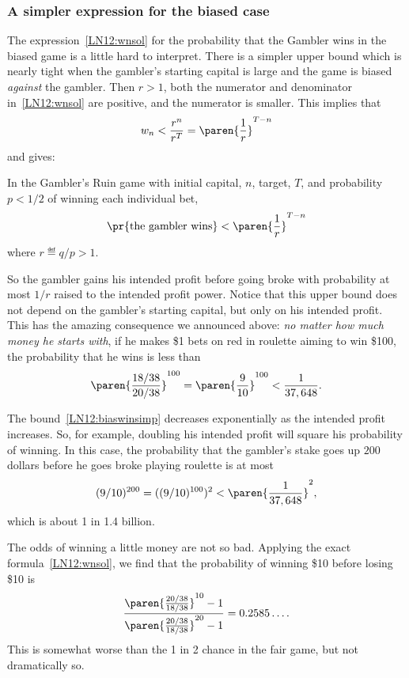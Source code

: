 \subsubsection{A simpler expression for the biased case}
The expression~\eqref{LN12:wnsol} for the probability that the Gambler
wins in the biased game is a little hard to interpret.  There is a
simpler upper bound which is nearly tight when the gambler's starting
capital is large and the game is biased \emph{against} the gambler.
Then $r >1$, both the numerator and denominator
in~\eqref{LN12:wnsol} are positive, and the numerator is smaller.
This implies that
\[
w_n < \frac{r^n}{r^T} = \paren{\frac{1}{r}}^{T-n}
\]
and gives:
\begin{corollary}\label{LN12:biaswincor}
  In the Gambler's Ruin game with initial capital, $n$, target, $T$,
  and probability $p < 1/2$ of winning each individual bet,
\begin{equation}\label{LN12:biaswinsimp}
\pr{\text{the gambler wins}} <  \paren{\frac{1}{r}}^{T-n} %
\end{equation}
where $r \eqdef q/p > 1$.
\end{corollary}

So the gambler gains his intended profit before going broke with
probability at most $1/r$ raised to the intended profit power.
Notice that this upper bound does not depend on the gambler's starting
capital, but only on his intended profit.  This has the amazing
consequence we announced above: \emph{no matter how much money he
  starts with}, if he makes \$1 bets on red in roulette aiming to win
\$100, the probability that he wins is less than
\[
\paren{\frac{18/38}{20/38}}^{100} = \paren{\frac{9}{10}}^{100} < \frac{1}{37,648}.
\]

The bound~\eqref{LN12:biaswinsimp} decreases exponentially as the
intended profit increases.  So, for example, doubling his intended
profit will square his probability of winning.  In this case, the
probability that the gambler's stake goes up $200$ dollars before he
goes broke playing roulette is at most
\[
(9/10)^{200} = ((9/10)^{100})^2 < \paren{\frac{1}{37,648}}^2,
\]
which is about 1 in 1.4 billion.

\begin{editingnotes}

The odds of winning a little money are not so bad.
Applying the exact formula~\eqref{LN12:wnsol}, we find that the probability
of winning \$10 before losing \$10 is
\[
\frac{\paren{\frac{20/38}{18/38}}^{10} - 1}
              {\paren{\frac{20/38}{18/38}}^{20} - 1}
  = 0.2585\dots.
\]
This is somewhat worse than the 1 in 2 chance in the fair game, but not
dramatically so.

\end{editingnotes}

